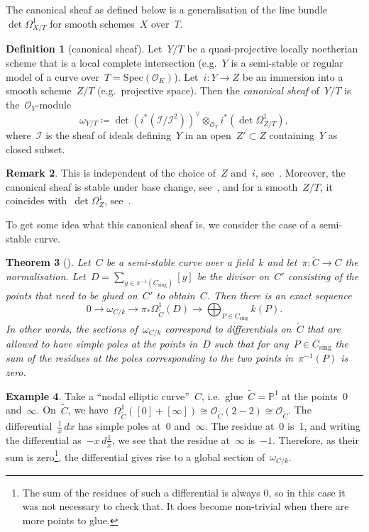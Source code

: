 \documentclass[12pt]{article}
\newtheorem{theorem}{Theorem}[section]
\theoremstyle{definition}
\newtheorem{definition}[theorem]{Definition}
\newtheorem{remark}[theorem]{Remark}
\newtheorem{example}[theorem]{Example}
\numberwithin{equation}{subsection}
\begin{document}
The canonical sheaf as defined below is a generalisation of the line bundle~$\det \Omega^1_{X/T}$ for smooth schemes~$X$ over~$T$.

\begin{definition}[canonical sheaf]
Let~$Y/T$ be a quasi-projective locally noetherian scheme that is a local complete intersection (e.g.~$Y$ is a semi-stable or regular model of a curve over~$T = \mathrm{Spec}(\mathcal{O}_K)$). Let~$i \colon Y \to Z$ be an immersion into a smooth scheme~$Z/T$ (e.g.\ projective space).
Then the {\em canonical sheaf} of~$Y/T$ is the~$\mathcal{O}_Y$-module
$$\omega_{Y/T} \coloneqq \det(i^*(\mathcal{I}/\mathcal{I}^2))^\vee \otimes_{\mathcal{O}_T} i^*(\det \Omega^1_{Z/T}),$$
where~$\mathcal{I}$ is the sheaf of ideals defining~$Y$ in an open~$Z' \subset Z$ containing~$Y$ as closed subset.
\end{definition}

\begin{remark}
This is independent of the choice of~$Z$ and~$i$, see~\cite[Sect.~6.4]{Liu}.
Moreover, the canonical sheaf is stable under base change, see~\cite[Thm.~6.4.9]{Liu}, and for a smooth~$Z/T$, it coincides with~$\det \Omega_Z^1$, see~\cite[Cor.~6.4.13]{Liu}.
\end{remark}

To get some idea what this canonical sheaf is, we consider the case of a semi-stable curve.

\begin{theorem}[\textrm{\cite[Prop.~13.2.9]{Olsson}}]
Let~$C$ be a semi-stable curve over a field~$k$ and let~$\pi \colon \widetilde{C} \to C$ the normalisation.
Let~$D = \sum_{y \in \pi^{-1}(C_{\mathrm{sing}})} [y]$ be the divisor on~$C'$ consisting of the points that need to be glued on~$C'$ to obtain~$C$.
Then there is an exact sequence
$$0 \to \omega_{C/k} \to \pi_*\Omega^1_{\widetilde{C}}(D) \to \bigoplus_{P \in C_{\mathrm{sing}}} k(P).$$
In other words, the sections of~$\omega_{C/k}$ correspond to differentials on~$\widetilde{C}$ that are allowed to have simple poles at the points in~$D$ such that for any~$P \in C_\mathrm{sing}$ the sum of the residues at the poles corresponding to the two points in~$\pi^{-1}(P)$ is zero.
\end{theorem}

\begin{example}
Take a ``nodal elliptic curve''~$C$, i.e.\ glue~$\widetilde{C} = \mathbb{P}^1$ at the points~$0$ and~$\infty$.
On~$\widetilde{C}$, we have~$\Omega^1_{\widetilde{C}}([0] + [\infty]) \cong \mathcal{O}_{\widetilde{C}}(2 - 2) \cong \mathcal{O}_{\widetilde{C}}$.
The differential~$\frac1x\,dx$ has simple poles at~$0$ and~$\infty$.
The residue at~0 is~1, and writing the differential as~$-x\,d\frac{1}{x}$, we see that the residue at~$\infty$ is~$-1$.
Therefore, as their sum is zero\footnote{The sum of the residues of such a differential is always 0, so in this case it was not necessary to check that. It does become non-trivial when there are more points to glue.}, the differential gives rise to a global section of~$\omega_{C/k}$.
\end{example}
\end{document}
